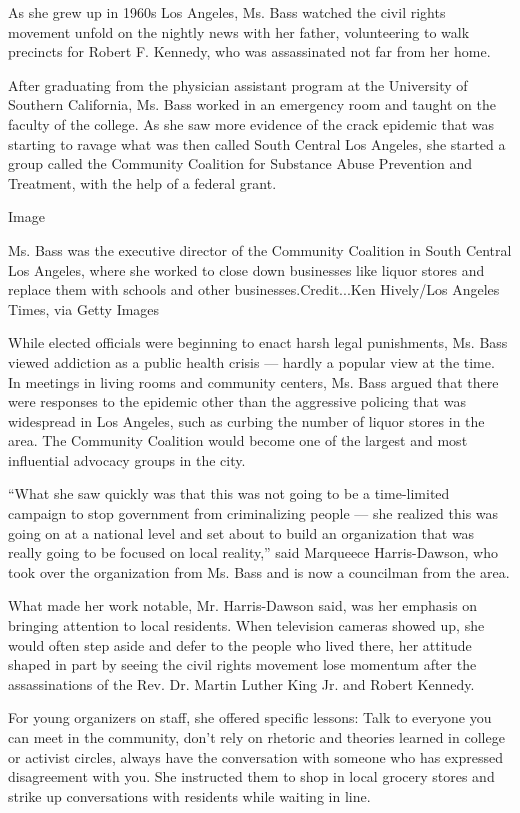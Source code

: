 As she grew up in 1960s Los Angeles, Ms. Bass watched the civil rights
movement unfold on the nightly news with her father, volunteering to
walk precincts for Robert F. Kennedy, who was assassinated not far from
her home.

After graduating from the physician assistant program at the University
of Southern California, Ms. Bass worked in an emergency room and taught
on the faculty of the college. As she saw more evidence of the crack
epidemic that was starting to ravage what was then called South Central
Los Angeles, she started a group called the Community Coalition for
Substance Abuse Prevention and Treatment, with the help of a federal
grant.

Image

Ms. Bass was the executive director of the Community Coalition in South
Central Los Angeles, where she worked to close down businesses like
liquor stores and replace them with schools and other
businesses.Credit...Ken Hively/Los Angeles Times, via Getty Images

While elected officials were beginning to enact harsh legal punishments,
Ms. Bass viewed addiction as a public health crisis --- hardly a popular
view at the time. In meetings in living rooms and community centers, Ms.
Bass argued that there were responses to the epidemic other than the
aggressive policing that was widespread in Los Angeles, such as curbing
the number of liquor stores in the area. The Community Coalition would
become one of the largest and most influential advocacy groups in the
city.

``What she saw quickly was that this was not going to be a time-limited
campaign to stop government from criminalizing people --- she realized
this was going on at a national level and set about to build an
organization that was really going to be focused on local reality,''
said Marqueece Harris-Dawson, who took over the organization from Ms.
Bass and is now a councilman from the area.

What made her work notable, Mr. Harris-Dawson said, was her emphasis on
bringing attention to local residents. When television cameras showed
up, she would often step aside and defer to the people who lived there,
her attitude shaped in part by seeing the civil rights movement lose
momentum after the assassinations of the Rev. Dr. Martin Luther King Jr.
and Robert Kennedy.

For young organizers on staff, she offered specific lessons: Talk to
everyone you can meet in the community, don't rely on rhetoric and
theories learned in college or activist circles, always have the
conversation with someone who has expressed disagreement with you. She
instructed them to shop in local grocery stores and strike up
conversations with residents while waiting in line.

